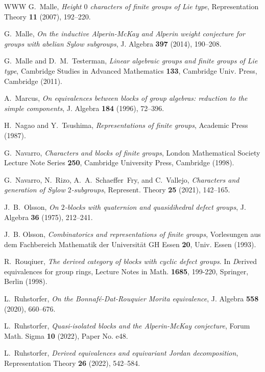 \documentclass{amsart}
\theoremstyle{plain}\newtheorem{Theorem}{Theorem}[section]
\theoremstyle{plain}\newtheorem{Conjecture}[Theorem]{Conjecture}
\theoremstyle{plain}\newtheorem{Corollary}[Theorem]{Corollary}
\theoremstyle{plain}\newtheorem{Lemma}[Theorem]{Lemma}
\theoremstyle{plain}\newtheorem{Proposition}[Theorem]{Proposition}
\theoremstyle{definition}\newtheorem{Definition}[Theorem]{Definition}
\theoremstyle{definition}\newtheorem{Example}[Theorem]{Example}
\theoremstyle{definition}\newtheorem{Examples}[Theorem]{Examples}
\theoremstyle{definition}\newtheorem{Exercise}[Theorem]{Exercise}
\theoremstyle{definition}\newtheorem{Notation}[Theorem]{Notation}
\theoremstyle{definition}\newtheorem{Remark}[Theorem]{Remark}
\theoremstyle{definition}\newtheorem{Remarks}[Theorem]{Remarks}
\numberwithin{equation}{section}
\begin{document}
\begin{thebibliography}{WWW}
 G.~Malle, {\em Height $0$ characters of finite groups of Lie type}, Representation Theory {\bf11} (2007), 192--220.

G.~Malle, \emph{On the inductive Alperin-McKay and Alperin weight conjecture for groups with abelian Sylow subgroups}, J. Algebra {\bf 397} (2014), 190--208.

G.~Malle and D.~M.~Testerman, \emph{Linear algebraic groups and finite groups of Lie type}, Cambridge Studies in Advanced Mathematics {\bf133}, Cambridge Univ. Press, Cambridge (2011).

 A.~Marcus, \emph{On equivalences between blocks of group algebras: reduction to the
	simple components}, J. Algebra {\bf 184} (1996), 72--396.

 H.~Nagao  and Y.~Tsushima, {\em Representations of finite groups}, Academic Press (1987).

 G.~Navarro, {\em Characters and blocks of finite groups}, London Mathematical Society Lecture Note Series {\bf250}, Cambridge University Press, Cambridge (1998).

G.~Navarro, N.~Rizo, A.~A.~Schaeffer~Fry, and C.~Vallejo, \emph{Characters and generation of Sylow $2$-subgroups}, Represent. Theory {\bf 25} (2021), 142--165.

 J.~B.~Olsson, {\em On $2$-blocks with quaternion and quasidihedral defect groups}, J. Algebra  \textbf{36} (1975), 212--241.

J.~B. Olsson, \emph{Combinatorics and representations of finite groups}, Vorlesungen aus dem Fachbereich Mathematik der Universit\"at GH Essen {\bf20}, Univ. Essen (1993).



 R.~Rouqiuer, \emph{The derived category of  blocks with cyclic defect groups}. In {\emph Derived equivalences for group rings}, Lecture  Notes in Math. {\bf 1685}, 199-220, Springer, Berlin (1998).

    L.~Ruhstorfer, \emph{On the Bonnaf\'e-Dat-Rouquier Morita equivalence}, J. Algebra {\bf 558} (2020), 660--676.

    L.~Ruhstorfer, \emph{Quasi-isolated blocks and the Alperin-McKay conjecture}, Forum Math. Sigma {\bf 10} (2022), Paper No. e48.

 L.~Ruhstorfer, \emph{Derived equivalences and equivariant Jordan decomposition},  Representation Theory {\bf 26} (2022), 542--584.
    

\end{thebibliography}
\end{document}
